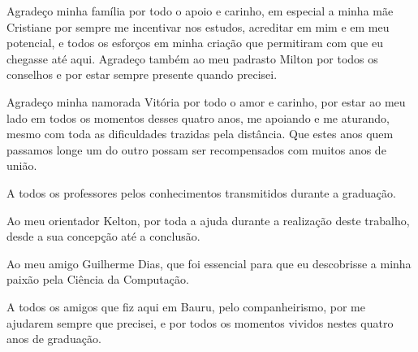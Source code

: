 \begin{agradecimentos}
Agradeço minha família por todo o apoio e carinho, em especial a minha mãe Cristiane por sempre me incentivar nos estudos, acreditar em mim e em meu potencial, e todos os esforços em minha criação que permitiram com que eu chegasse até aqui. Agradeço também ao meu padrasto Milton por todos os conselhos e por estar sempre presente quando precisei.

Agradeço minha namorada Vitória por todo o amor e carinho, por estar ao meu lado em todos os momentos desses quatro anos, me apoiando e me aturando, mesmo com toda as dificuldades trazidas pela distância. Que estes anos quem passamos longe um do outro possam ser recompensados com muitos anos de união.

A todos os professores pelos conhecimentos transmitidos durante a graduação.

Ao meu orientador Kelton, por toda a ajuda durante a realização deste trabalho, desde a sua concepção até a conclusão.

Ao meu amigo Guilherme Dias, que foi essencial para que eu descobrisse a minha paixão pela Ciência da Computação.

A todos os amigos que fiz aqui em Bauru, pelo companheirismo, por me ajudarem sempre que precisei, e por todos os momentos vividos nestes quatro anos de graduação. 
\end{agradecimentos}